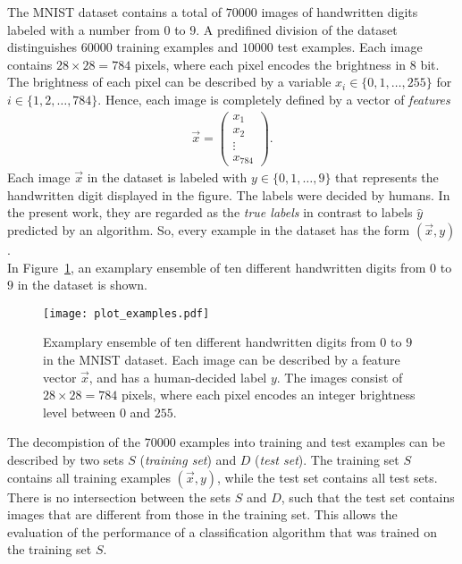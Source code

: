 The MNIST dataset contains a total of $70000$ images of handwritten digits labeled with a number from $0$ to $9$. A predifined division of the dataset distinguishes $60000$ training examples and $10000$ test examples. Each image contains $28 \times 28 = 784$ pixels, where each pixel encodes the brightness in $8$ bit. The brightness of each pixel can be described by a variable $x_i \in \{0, 1, \dots, 255\}$ for $i \in \{1, 2, \dots, 784\}$. Hence, each image is completely defined by a vector of \textit{features}
\begin{align*}
\vec{x} = 
\begin{pmatrix}
x_1\\
x_2\\
\vdots\\
x_{784}
\end{pmatrix}.
\end{align*}
Each image $\vec{x}$ in the dataset is labeled with $y \in \{0, 1, \dots, 9\}$ that represents the handwritten digit displayed in the figure. The labels were decided by humans. In the present work, they are regarded as the \textit{true labels} in contrast to labels $\hat{y}$ predicted by an algorithm. So, every example in the dataset has the form $(\vec{x}, y)$.\\

In Figure~\ref{fig:plot_examples}, an examplary ensemble of ten different handwritten digits from $0$ to $9$ in the dataset is shown. 
\begin{figure}[h!]
\texttt{[image: plot\_examples.pdf]}
\caption{Examplary ensemble of ten different handwritten digits from $0$ to $9$ in the MNIST dataset. Each image can be described by a feature vector $\vec{x}$, and has a human-decided label $y$. The images consist of $28 \times 28 = 784$ pixels, where each pixel encodes an integer brightness level between $0$ and $255$.}
\label{fig:plot_examples}
\end{figure}

The decompistion of the $70000$ examples into training and test examples can be described by two sets $S$ (\textit{training set}) and $D$ (\textit{test set}). The training set $S$ contains all training examples $(\vec{x}, y)$, while the test set contains all test sets. There is no intersection between the sets $S$ and $D$, such that the test set contains images that are different from those in the training set. This allows the evaluation of the performance of a classification algorithm that was trained on the training set $S$.\\

